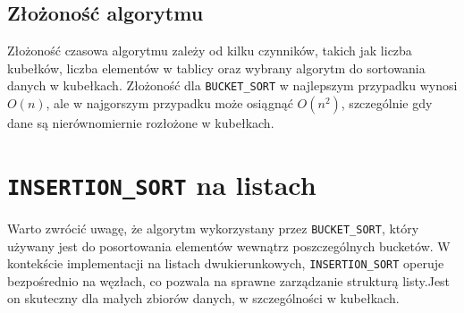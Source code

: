 \documentclass{article}
\begin{document}
\subsection{Złożoność algorytmu}
Złożoność czasowa algorytmu zależy od kilku czynników, takich jak liczba kubełków, liczba elementów w tablicy oraz wybrany algorytm do sortowania danych w kubełkach. Złożoność dla \texttt{BUCKET\_SORT} w najlepszym przypadku wynosi \(O(n)\), ale w najgorszym przypadku może osiągnąć \(O(n^2)\), szczególnie gdy dane są nierównomiernie rozłożone w kubełkach. 
	
\section{\texttt{INSERTION\_SORT} na listach}
Warto zwrócić uwagę, że algorytm wykorzystany przez \texttt{BUCKET\_SORT}, który używany jest do posortowania elementów wewnątrz poszczególnych bucketów. W kontekście implementacji na listach dwukierunkowych, \texttt{INSERTION\_SORT} operuje bezpośrednio na węzłach, co pozwala na sprawne zarządzanie strukturą listy.Jest on skuteczny dla małych zbiorów danych, w szczególności w kubełkach. 
	
\end{document}
